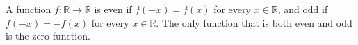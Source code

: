 A function $f : \mathbb{R} \to \mathbb{R}$ is even if $f(-x) = f(x)$ for every $x \in \mathbb{R}$, and odd if $f(-x) = -f(x)$ for every $x \in \mathbb{R}$.
The only function that is both even and odd is the zero function.